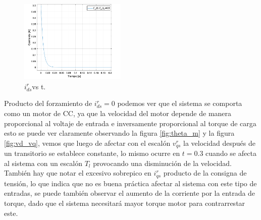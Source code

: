 \documentclass[10pt]{article}
\begin{document}
\begin{itemize}
	\begin{figure}[h!]
	\centering
	\includegraphics[width=0.45\textwidth]{ids.png}
	\caption{\label{fig:ids} $i^{r}_{ds}$vs t.}
	\end{figure}
	Producto del forzamiento de $i^{r}_{ds}=0$ podemos ver que el sistema se comporta como un motor de CC, ya que la velocidad del motor depende de manera proporcional al voltaje de entrada e inversamente proporcional al torque de carga esto se puede ver claramente observando la figura \ref{fig:theta_m} y la figura \ref{fig:vd_vq}, vemos que luego de afectar con el escalón $v^{r}_{qs}$ la velocidad después de un transitorio se establece constante, lo mismo ocurre en $t=0.3$ cuando se afecta al sistema con un escalón $T_{l}$ provocando una disminución de la velocidad.
	También hay que notar el excesivo sobrepico en $i^{r}_{qs}$ producto de la consigna de tensión, lo que indica que no es buena práctica afectar al sistema con este tipo de entradas, se puede también observar el aumento de la corriente por la entrada de torque, dado que el sistema necesitará mayor torque motor para contrarrestar este.\\
	

\end{itemize}
\end{document}
